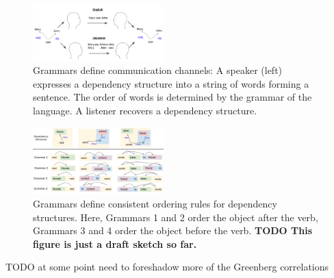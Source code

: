 \documentclass[9pt,twocolumn,twoside,lineno]{pnas-new}
\begin{document}
\begin{figure}
    \centering
    \includegraphics[width=0.45\textwidth]{figures/communication-two-langs.png}
	\caption{Grammars define communication channels: A speaker (left) expresses a dependency structure into a string of words forming a sentence. The order of words is determined by the grammar of the language. A listener recovers a dependency structure.}
	\label{fig:comm}
\end{figure}



\begin{figure}
    \centering
    \includegraphics[width=0.45\textwidth]{figures/grammars-colors-trees.png}
	\caption{Grammars define consistent ordering rules for dependency structures. Here, Grammars 1 and 2 order the object after the verb, Grammars 3 and 4 order the object before the verb. \textbf{TODO This figure is just a draft sketch so far.}}
	\label{fig:grammars}
\end{figure}






TODO at some point need to foreshadow more of the Greenberg correlations


%
%
\end{document}
